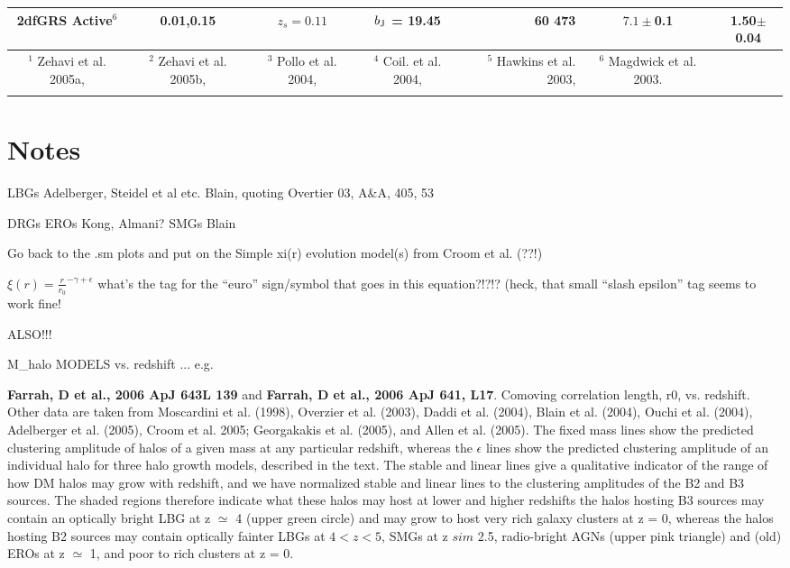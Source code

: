 \documentclass[usenatbib]{mn2e}
\def \bj {b_{\rm J}}
\begin{document}
\begin{table*}
\begin{center}
\begin{tabular}{ccccrcc}
2dfGRS Active$^6$  & 0.01,0.15  & $z_{s}= 0.11$  & $\bj$ = 19.45            &   60 473 & $7.1 \pm$0.1          & 1.50$\pm$0.04            \\
\hline
$^1$ Zehavi et al. 2005a, & $^2$ Zehavi et al. 2005b, & $^3$ Pollo et al. 2004, & $^4$ Coil. et al. 2004, & 
$^5$ Hawkins et al. 2003, & $^6$ Magdwick et al. 2003. &\\
\label{tab:r_nought_comp}
\end{tabular}
\end{center}
\end{table*}



\section{Notes}
LBGs Adelberger, Steidel et al etc. 
Blain, quoting Overtier 03, A&A, 405, 53


DRGs
EROs Kong, Almani?
SMGs Blain

Go back to the .sm plots and put on the 
Simple xi(r) evolution model(s) from Croom et al. (??!)

$\xi(r) = \frac{r}{r_{0}}^{-\gamma + \epsilon}$ what's the tag for the ``euro'' sign/symbol that goes in this equation?!?!?
(heck, that small ``slash epsilon'' tag seems to work fine!

{\LARGE ALSO!!! }


M_{\rm halo} MODELS vs. redshift ... 
e.g. 


{\bf Farrah, D et al.,  2006 ApJ  643L 139} and 
{\bf Farrah, D et al.,  2006 ApJ  641, L17}.  
Comoving correlation length, r0, vs. redshift. Other data are taken from Moscardini et al. (1998), Overzier et al. (2003), Daddi et al. (2004), Blain et al. (2004), Ouchi et al. (2004), Adelberger et al. (2005), Croom et al. 2005; Georgakakis et al. (2005), and Allen et al. (2005). The fixed mass lines show the predicted clustering amplitude of halos of a given mass at any particular redshift, whereas the $\epsilon$ lines show the predicted clustering amplitude of an individual halo for three halo growth models, described in the text. The stable and linear lines give a qualitative indicator of the range of how DM halos may grow with redshift, and we have normalized stable and linear lines to the clustering amplitudes of the B2 and B3 sources. The shaded regions therefore indicate what these halos may host at lower and higher redshifts the halos hosting B3 sources may contain an optically bright LBG at z $\simeq$ 4 (upper green circle) and may grow to host very rich galaxy clusters at z = 0, whereas the halos hosting B2 sources may contain optically fainter LBGs at $4 < z < 5$, SMGs at z $sim$ 2.5, radio-bright AGNs (upper pink triangle) and (old) EROs at z $\simeq$ 1, and poor to rich clusters at z = 0.
\end{document}
